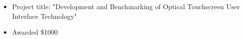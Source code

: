 \small
\begin{itemize}
    \item Project title: "Development and Benchmarking of Optical Touchscreen User Interface Technology"
    \item Awarded \$1000
\end{itemize}
\normalsize
